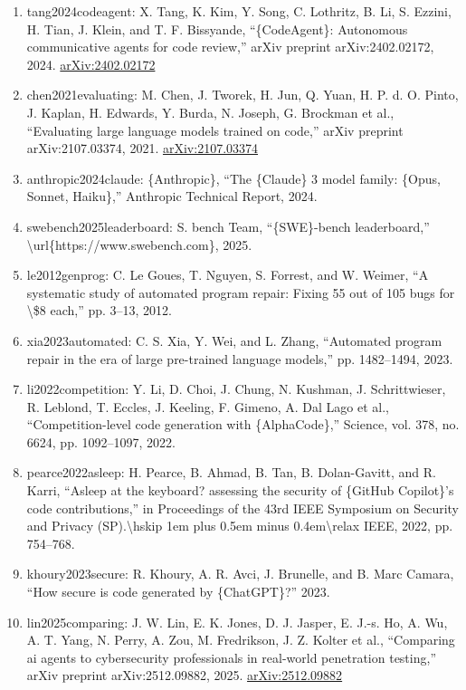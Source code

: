 \documentclass[11pt]{article}
\begin{document}
\begin{enumerate}[leftmargin=*]
  \item tang2024codeagent: X. Tang, K. Kim, Y. Song, C. Lothritz, B. Li, S. Ezzini, H. Tian, J. Klein, and T. F. Bissyande, ``\{CodeAgent\}: Autonomous communicative agents for code review,'' arXiv preprint arXiv:2402.02172, 2024. \href{https://arxiv.org/abs/2402.02172}{arXiv:2402.02172}
  \item chen2021evaluating: M. Chen, J. Tworek, H. Jun, Q. Yuan, H. P. d. O. Pinto, J. Kaplan, H. Edwards, Y. Burda, N. Joseph, G. Brockman et al., ``Evaluating large language models trained on code,'' arXiv preprint arXiv:2107.03374, 2021. \href{https://arxiv.org/abs/2107.03374}{arXiv:2107.03374}
  \item anthropic2024claude: \{Anthropic\}, ``The \{Claude\} 3 model family: \{Opus, Sonnet, Haiku\},'' Anthropic Technical Report, 2024.
  \item swebench2025leaderboard: S. bench Team, ``\{SWE\}-bench leaderboard,'' \textbackslash{}url\{https://www.swebench.com\}, 2025.
  \item le2012genprog: C. Le Goues, T. Nguyen, S. Forrest, and W. Weimer, ``A systematic study of automated program repair: Fixing 55 out of 105 bugs for \textbackslash{}\$8 each,'' pp. 3--13, 2012.
  \item xia2023automated: C. S. Xia, Y. Wei, and L. Zhang, ``Automated program repair in the era of large pre-trained language models,'' pp. 1482--1494, 2023.
  \item li2022competition: Y. Li, D. Choi, J. Chung, N. Kushman, J. Schrittwieser, R. Leblond, T. Eccles, J. Keeling, F. Gimeno, A. Dal Lago et al., ``Competition-level code generation with \{AlphaCode\},'' Science, vol. 378, no. 6624, pp. 1092--1097, 2022.
  \item pearce2022asleep: H. Pearce, B. Ahmad, B. Tan, B. Dolan-Gavitt, and R. Karri, ``Asleep at the keyboard? assessing the security of \{GitHub Copilot\}'s code contributions,'' in Proceedings of the 43rd IEEE Symposium on Security and Privacy (SP).\textbackslash{}hskip 1em plus 0.5em minus 0.4em\textbackslash{}relax IEEE, 2022, pp. 754--768.
  \item khoury2023secure: R. Khoury, A. R. Avci, J. Brunelle, and B. Marc Camara, ``How secure is code generated by \{ChatGPT\}?'' 2023.
  \item lin2025comparing: J. W. Lin, E. K. Jones, D. J. Jasper, E. J.-s. Ho, A. Wu, A. T. Yang, N. Perry, A. Zou, M. Fredrikson, J. Z. Kolter et al., ``Comparing ai agents to cybersecurity professionals in real-world penetration testing,'' arXiv preprint arXiv:2512.09882, 2025. \href{https://arxiv.org/abs/2512.09882}{arXiv:2512.09882}

\end{enumerate}
\end{document}
